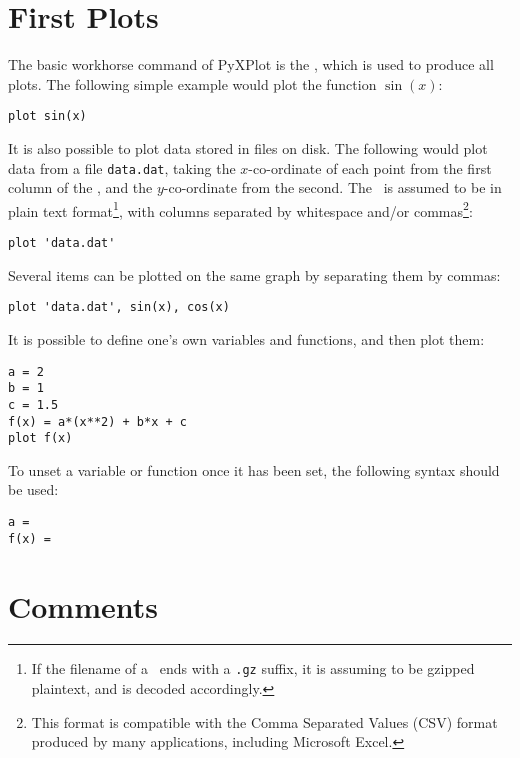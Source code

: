 \section{First Plots}
\label{first_plots}

The basic workhorse command of PyXPlot is the , which is used to
produce all plots. The following simple example would plot the function
$\sin(x)$:

\begin{verbatim}
plot sin(x)
\end{verbatim}

\noindent It is also possible to plot data stored in files on disk. The
following would plot data from a file {\tt data.dat}, taking the
$x$-co-ordinate of each point from the first column of the \datafile, and the
$y$-co-ordinate from the second.  The \datafile\ is assumed to be in plain text
format\footnote{If the filename of a \datafile\ ends with a {\tt .gz} suffix,
it is assuming to be gzipped plaintext, and is decoded accordingly.}, with
columns separated by whitespace and/or commas\footnote{This format is
compatible with the Comma Separated Values (CSV) format produced by many
applications, including Microsoft Excel.}:

\begin{verbatim}
plot 'data.dat'
\end{verbatim}

Several items can be plotted on the same graph by separating them by commas:

\begin{verbatim}
plot 'data.dat', sin(x), cos(x)
\end{verbatim}

\noindent It is possible to define one's own variables and functions, and then
plot them:

\begin{verbatim}
a = 2
b = 1
c = 1.5
f(x) = a*(x**2) + b*x + c
plot f(x)
\end{verbatim}

\noindent To unset a variable or function once it has been set, the following
syntax should be
used:

\begin{verbatim}
a =
f(x) =
\end{verbatim}

\section{Comments}

